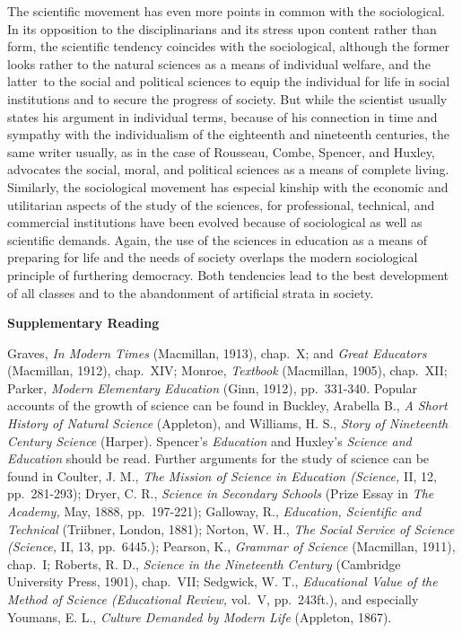 \documentclass[
]{book}
\begin{document}
The scientific movement has even more points in common with the sociological. In its opposition to the disciplinarians and its stress upon content rather than form, the scientific tendency coincides with the sociological, although the former looks rather to the natural sciences as a means of individual welfare, and the latter~to the social and political sciences to equip the individual for life in social institutions and to secure the progress of society. But while the scientist usually states his argument in individual terms, because of his connection in time and sympathy with the individualism of the eighteenth and nineteenth centuries, the same writer usually, as in the case of Rousseau, Combe, Spencer, and Huxley, advocates the social, moral, and political sciences as a means of complete living. Similarly, the sociological movement has especial kinship with the economic and utilitarian aspects of the study of the sciences, for professional, technical, and commercial institutions have been evolved because of sociological as well as scientific demands. Again, the use of the sciences in education as a means of preparing for life and the needs of society overlaps the modern sociological principle of furthering democracy. Both tendencies lead to the best development of all classes and to the abandonment of artificial strata in society.

\textbf{Supplementary Reading}

Graves, \emph{In Modern Times} (Macmillan, 1913), chap.~X; and \emph{Great Educators} (Macmillan, 1912), chap.~XIV; Monroe, \emph{Textbook} (Macmillan, 1905), chap.~XII; Parker, \emph{Modern Elementary Education} (Ginn, 1912), pp.~331-340. Popular accounts of the growth of science can be found in Buckley, Arabella B., \emph{A Short History of Natural Science} (Appleton), and Williams, H. S., \emph{Story of Nineteenth Century Science} (Harper). Spencer's \emph{Education} and Huxley's \emph{Science and Education} should be read. Further arguments for the study of science can be found in Coulter, J. M., \emph{The Mission of Science in Education (Science,} II, 12, pp.~281-293); Dryer, C. R., \emph{Science in Secondary Schools} (Prize Essay in \emph{The Academy,} May, 1888, pp.~197-221); Galloway, R., \emph{Education, Scientific and Technical} (Triibner, London, 1881); Norton, W. H., \emph{The Social Service of Science (Science,} II, 13, pp.~6445.); Pearson, K., \emph{Grammar of Science} (Macmillan, 1911), chap.~I; Roberts, R. D., \emph{Science in the Nineteenth Century} (Cambridge University Press, 1901), chap.~VII; Sedgwick, W. T., \emph{Educational Value of the Method of Science (Educational Review,} vol.~V, pp.~243ft.), and especially Youmans, E. L., \emph{Culture Demanded by Modern Life} (Appleton, 1867).
\end{document}
